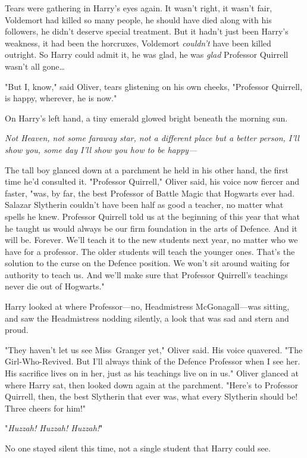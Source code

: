 Tears were gathering in Harry's eyes again. It wasn't right, it wasn't fair,
Voldemort had killed so many people, he should have died along with his
followers, he didn't deserve special treatment. But it hadn't just been Harry's
weakness, it had been the horcruxes, Voldemort \emph{couldn't} have been killed
outright. So Harry could admit it, he was glad, he was \emph{glad} Professor
Quirrell wasn't all gone{\ldots}

"But I, know," said Oliver, tears glistening on his own cheeks, "Professor
Quirrell, is happy, wherever, he is now."

On Harry's left hand, a tiny emerald glowed bright beneath the morning sun.

\emph{Not Heaven, not some faraway star, not a different place but a better
person, I'll show you, some day I'll show you how to be happy---}

The tall boy glanced down at a parchment he held in his other hand, the first
time he'd consulted it. "Professor Quirrell," Oliver said, his voice now
fiercer and faster, "was, by far, the best Professor of Battle Magic that
Hogwarts ever had. Salazar Slytherin couldn't have been half as good a teacher,
no matter what spells he knew. Professor Quirrell told us at the beginning of
this year that what he taught us would always be our firm foundation in the
arts of Defence. And it will be. Forever. We'll teach it to the new students
next year, no matter who we have for a professor. The older students will teach
the younger ones. That's the solution to the curse on the Defence position. We
won't sit around waiting for authority to teach us. And we'll make sure that
Professor Quirrell's teachings never die out of Hogwarts."

Harry looked at where Professor---no, Headmistress McGonagall---was sitting,
and saw the Headmistress nodding silently, a look that was sad and stern and
proud.

"They haven't let us see Miss~Granger yet," Oliver said. His voice quavered.
"The Girl-Who-Revived. But I'll always think of the Defence Professor when I
see her. His sacrifice lives on in her, just as his teachings live on in us."
Oliver glanced at where Harry sat, then looked down again at the parchment.
"Here's to Professor Quirrell, then, the best Slytherin that ever was, what
every Slytherin should be! Three cheers for him!"

"\emph{Huzzah! Huzzah! Huzzah!}"

No one stayed silent this time, not a single student that Harry could see.
